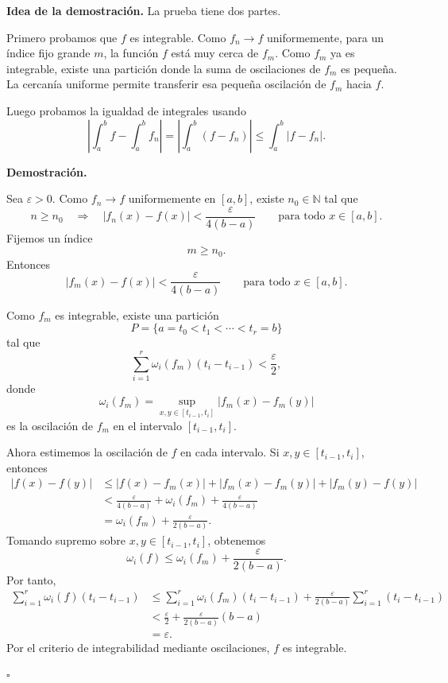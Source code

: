 \documentclass[11pt,a4paper,openany]{book}
\theoremstyle{definition}
\theoremstyle{plain}
\theoremstyle{remark}
\renewenvironment{proof}[1][\textbf{Demostración.}]{%
  \par\noindent #1\ \normalfont
}{\hfill$\square$\par\medskip}
\newenvironment{idea}
{\begin{comentariolibro}\textbf{Idea de la demostración. }\normalfont}
{\end{comentariolibro}}
\newcommand{\N}{\mathbb{N}}
\begin{document}
\begin{idea}
La prueba tiene dos partes.

Primero probamos que $f$ es integrable. Como $f_n\to f$ uniformemente, para
un índice fijo grande $m$, la función $f$ está muy cerca de $f_m$. Como $f_m$
ya es integrable, existe una partición donde la suma de oscilaciones de $f_m$
es pequeña. La cercanía uniforme permite transferir esa pequeña oscilación de
$f_m$ hacia $f$.

Luego probamos la igualdad de integrales usando
\[
    \left|\int_a^b f-\int_a^b f_n\right|
    =
    \left|\int_a^b(f-f_n)\right|
    \leq
    \int_a^b|f-f_n|.
\]
\end{idea}

\begin{proof}
Sea $\varepsilon>0$. Como $f_n\to f$ uniformemente en $[a,b]$, existe
$n_0\in\N$ tal que
\[
    n\geq n_0
    \quad\Longrightarrow\quad
    |f_n(x)-f(x)|<\frac{\varepsilon}{4(b-a)}
    \qquad\text{para todo }x\in[a,b].
\]
Fijemos un índice
\[
    m\geq n_0.
\]
Entonces
\[
    |f_m(x)-f(x)|<\frac{\varepsilon}{4(b-a)}
    \qquad\text{para todo }x\in[a,b].
\]

Como $f_m$ es integrable, existe una partición
\[
    P=\{a=t_0<t_1<\cdots<t_r=b\}
\]
tal que
\[
    \sum_{i=1}^r \omega_i(f_m)(t_i-t_{i-1})
    <
    \frac{\varepsilon}{2},
\]
donde
\[
    \omega_i(f_m)
    =
    \sup_{x,y\in[t_{i-1},t_i]}
    |f_m(x)-f_m(y)|
\]
es la oscilación de $f_m$ en el intervalo $[t_{i-1},t_i]$.

Ahora estimemos la oscilación de $f$ en cada intervalo. Si
$x,y\in[t_{i-1},t_i]$, entonces
\[
\begin{aligned}
    |f(x)-f(y)|
    &\leq |f(x)-f_m(x)|
        +|f_m(x)-f_m(y)|
        +|f_m(y)-f(y)|  \\
    &<
        \frac{\varepsilon}{4(b-a)}
        +
        \omega_i(f_m)
        +
        \frac{\varepsilon}{4(b-a)} \\
    &=
        \omega_i(f_m)
        +
        \frac{\varepsilon}{2(b-a)}.
\end{aligned}
\]
Tomando supremo sobre $x,y\in[t_{i-1},t_i]$, obtenemos
\[
    \omega_i(f)
    \leq
    \omega_i(f_m)
    +
    \frac{\varepsilon}{2(b-a)}.
\]
Por tanto,
\[
\begin{aligned}
    \sum_{i=1}^r \omega_i(f)(t_i-t_{i-1})
    &\leq
    \sum_{i=1}^r \omega_i(f_m)(t_i-t_{i-1})
    +
    \frac{\varepsilon}{2(b-a)}
    \sum_{i=1}^r(t_i-t_{i-1}) \\
    &<
    \frac{\varepsilon}{2}
    +
    \frac{\varepsilon}{2(b-a)}(b-a) \\
    &=
    \varepsilon.
\end{aligned}
\]
Por el criterio de integrabilidad mediante oscilaciones, $f$ es integrable.


\end{proof}
\end{document}
